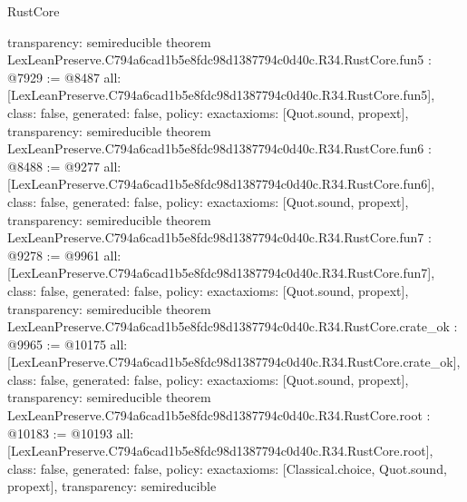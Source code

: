 \begin{lexlean}{RustCore}
\begin{coremodule}
{  transparency: semireducible
}
theorem LexLeanPreserve.C794a6cad1b5e8fdc98d1387794c0d40c.R34.RustCore.fun5 : @7929 := @8487 {
  all: [LexLeanPreserve.C794a6cad1b5e8fdc98d1387794c0d40c.R34.RustCore.fun5],
  class: false,
  generated: false,
  policy: exact{axioms: [Quot.sound, propext]},
  transparency: semireducible
}
theorem LexLeanPreserve.C794a6cad1b5e8fdc98d1387794c0d40c.R34.RustCore.fun6 : @8488 := @9277 {
  all: [LexLeanPreserve.C794a6cad1b5e8fdc98d1387794c0d40c.R34.RustCore.fun6],
  class: false,
  generated: false,
  policy: exact{axioms: [Quot.sound, propext]},
  transparency: semireducible
}
theorem LexLeanPreserve.C794a6cad1b5e8fdc98d1387794c0d40c.R34.RustCore.fun7 : @9278 := @9961 {
  all: [LexLeanPreserve.C794a6cad1b5e8fdc98d1387794c0d40c.R34.RustCore.fun7],
  class: false,
  generated: false,
  policy: exact{axioms: [Quot.sound, propext]},
  transparency: semireducible
}
theorem LexLeanPreserve.C794a6cad1b5e8fdc98d1387794c0d40c.R34.RustCore.crate_ok : @9965 := @10175 {
  all: [LexLeanPreserve.C794a6cad1b5e8fdc98d1387794c0d40c.R34.RustCore.crate_ok],
  class: false,
  generated: false,
  policy: exact{axioms: [Quot.sound, propext]},
  transparency: semireducible
}
theorem LexLeanPreserve.C794a6cad1b5e8fdc98d1387794c0d40c.R34.RustCore.root : @10183 := @10193 {
  all: [LexLeanPreserve.C794a6cad1b5e8fdc98d1387794c0d40c.R34.RustCore.root],
  class: false,
  generated: false,
  policy: exact{axioms: [Classical.choice, Quot.sound, propext]},
  transparency: semireducible
}


\end{coremodule}
\end{lexlean}
